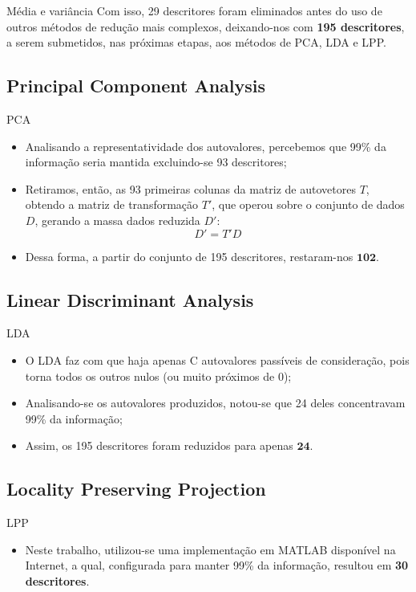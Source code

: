 \begin{frame}{Média e variância}
	Com isso, 29 descritores foram eliminados antes do uso de outros métodos de redução mais complexos, deixando-nos
	com \textbf{195 descritores}, a serem submetidos, nas próximas etapas, aos métodos de PCA, LDA e LPP.
\end{frame}


\subsection[PCA]{Principal Component Analysis}
\begin{frame}{PCA}

\begin{itemize}
	\item Analisando a representatividade dos autovalores, percebemos que 99\% da informação 
	seria mantida excluindo-se 93 descritores;
	\item Retiramos, então, as 93 primeiras colunas da matriz de autovetores $T$, obtendo a
	matriz de transformação $T'$, que operou sobre o conjunto de dados $D$, gerando a massa
	dados reduzida $D'$:
	$$D' = T'D$$
	\item Dessa forma, a partir do conjunto de 195 descritores, restaram-nos $\mathbf{102}$.
\end{itemize}
\end{frame}

\subsection[LDA]{Linear Discriminant Analysis}
\begin{frame}{LDA}

\begin{itemize}

	\item O LDA faz com que haja apenas C autovalores passíveis de consideração, pois
torna todos os outros nulos (ou muito próximos de 0); 
	\item Analisando-se os autovalores produzidos, notou-se que 24 deles concentravam 99\% da informação; 
	\item Assim, os 195 descritores foram reduzidos para apenas $\mathbf{24}$.

\end{itemize}
\end{frame}

\subsection[LPP]{Locality Preserving Projection}
\begin{frame}{LPP}
\begin{itemize}
	\item Neste trabalho, utilizou-se uma implementação em MATLAB disponível na Internet, a qual, 
	configurada para manter 99\% da informação, resultou em \textbf{30 descritores}.
\end{itemize}
\end{frame}

